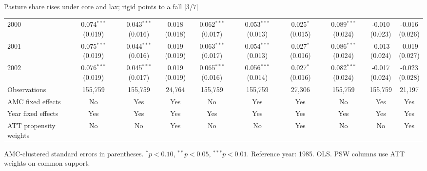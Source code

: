 \documentclass[aspectratio=169]{beamer}
\begin{document}
\begin{frame}{Pasture share rises under core and lax; rigid points to a fall [3/7]}
{\begin{tabular}{@{}l*{9}{c}@{}}
2000 & \shortstack{0.074$^{***}$\\(0.019)} & \shortstack{0.043$^{***}$\\(0.016)} & \shortstack{0.018\\(0.018)} & \shortstack{0.062$^{***}$\\(0.017)} & \shortstack{0.053$^{***}$\\(0.013)} & \shortstack{0.025$^{*}$\\(0.015)} & \shortstack{0.089$^{***}$\\(0.024)} & \shortstack{-0.010\\(0.023)} & \shortstack{-0.016\\(0.026)} \\
2001 & \shortstack{0.075$^{***}$\\(0.019)} & \shortstack{0.044$^{***}$\\(0.016)} & \shortstack{0.019\\(0.019)} & \shortstack{0.063$^{***}$\\(0.017)} & \shortstack{0.054$^{***}$\\(0.013)} & \shortstack{0.027$^{*}$\\(0.016)} & \shortstack{0.086$^{***}$\\(0.024)} & \shortstack{-0.013\\(0.024)} & \shortstack{-0.019\\(0.027)} \\
2002 & \shortstack{0.076$^{***}$\\(0.019)} & \shortstack{0.045$^{***}$\\(0.017)} & \shortstack{0.019\\(0.019)} & \shortstack{0.065$^{***}$\\(0.016)} & \shortstack{0.056$^{***}$\\(0.014)} & \shortstack{0.027$^{*}$\\(0.016)} & \shortstack{0.082$^{***}$\\(0.024)} & \shortstack{-0.017\\(0.024)} & \shortstack{-0.023\\(0.028)} \\
\midrule
Observations & 155,759 & 155,759 & 24,764 & 155,759 & 155,759 & 27,306 & 155,759 & 155,759 & 21,197 \\
AMC fixed effects & No & Yes & Yes & No & Yes & Yes & No & Yes & Yes \\
Year fixed effects & Yes & Yes & Yes & Yes & Yes & Yes & Yes & Yes & Yes \\
ATT propensity weights & No & No & Yes & No & No & Yes & No & No & Yes \\
\bottomrule
\end{tabular}%
}
\vspace{0.1em}
{\tiny\color{ZMidGray} AMC-clustered standard errors in parentheses. $^{*}p<0.10$, $^{**}p<0.05$, $^{***}p<0.01$. Reference year: 1985. OLS. PSW columns use ATT weights on common support.}
\end{frame}
\end{document}

